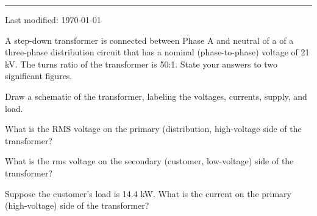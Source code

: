 \documentclass{article}
\begin{document}
\newpage
\setcounter{problem}{0}
\setcounter{page}{1}
\hrule
\vspace{10pt}

{\tiny Last modified: \today}



A step-down transformer is connected between Phase A and neutral of a of
a three-phase distribution circuit that has a nominal (phase-to-phase)
voltage of 21 kV.  The turns ratio of the transformer is 50:1.  State
your answers to two significant figures.

\newcommand{\quizbox}[1]{
\begin{minipage}{0.25\textwidth}
\framebox[1.5in]{\rule{0cm}{0.8cm}}
\end{minipage}
\begin{minipage}{0.75\textwidth}
\subproblem
#1
\end{minipage}
}

\subproblem Draw a schematic of the transformer, labeling the voltages, currents,
supply, and load.

\quizbox{What is the RMS voltage on the primary (distribution,
high-voltage side of the transformer?}



\quizbox{What is the rms voltage on the secondary (customer, low-voltage)
side of the transformer?}


\quizbox{Suppose the customer's load is 14.4 kW.  What is the current on the
primary (high-voltage) side of the transformer?}
\end{document}
